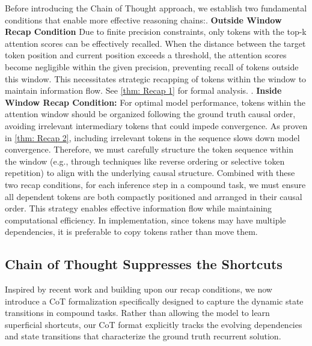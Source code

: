 Before introducing the Chain of Thought \cite{wei2022chain} approach, we establish two fundamental conditions that enable more effective reasoning chains:. \textbf{Outside Window Recap Condition} Due to finite precision constraints, only tokens with the top-k attention scores can be effectively recalled. When the distance between the target token position and current position exceeds a threshold, the attention scores become negligible within the given precision, preventing recall of tokens outside this window. This necessitates strategic recapping of tokens within the window to maintain information flow. See \ref{thm: Recap 1} for formal analysis.
. \textbf{Inside Window Recap Condition:} For optimal model performance, tokens within the attention window should be organized following the ground truth causal order, avoiding irrelevant intermediary tokens that could impede convergence. As proven in \ref{thm: Recap 2}, including irrelevant tokens in the sequence slows down model convergence. Therefore, we must carefully structure the token sequence within the window (e.g., through techniques like reverse ordering or selective token repetition) to align with the underlying causal structure.
\newline
Combined with these two recap conditions, for each inference step in a compound task, we must ensure all dependent tokens are both compactly positioned and arranged in their causal order. This strategy enables effective information flow while maintaining computational efficiency. In implementation, since tokens may have multiple dependencies, it is preferable to copy tokens rather than move them.


\subsection{Chain of Thought Suppresses the Shortcuts}
Inspired by recent work \cite{li2024chainthoughtempowerstransformers, feng2023revealingmysterychainthought} and building upon our recap conditions, we now introduce a CoT formalization specifically designed to capture the dynamic state transitions in compound tasks. Rather than allowing the model to learn superficial shortcuts, our CoT format explicitly tracks the evolving dependencies and state transitions that characterize the ground truth recurrent solution.

